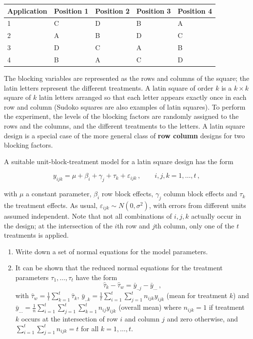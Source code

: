 \documentclass[
]{book}
\theoremstyle{definition}
\theoremstyle{definition}
\theoremstyle{definition}
\theoremstyle{definition}
\theoremstyle{remark}
\begin{document}
\begin{enumerate}
  \begin{tabular}{l|l|l|l|l}
   \hline
   Application & Position 1 & Position 2 & Position 3 & Position 4\\
   \hline
   1 & C & D & B & A\\
   \hline
   2 & A & B & D & C\\
   \hline
   3 & D & C & A & B\\
   \hline
   4 & B & A & C & D\\
   \hline
   \end{tabular}

  The blocking variables are represented as the rows and columns of the square; the latin letters represent the different treatments. A latin square of order \(k\) is a \(k\times k\) square of \(k\) latin letters arranged so that each letter appears exactly once in each row and column (Sudoko squares are also examples of latin squares). To perform the experiment, the levels of the blocking factors are randomly assigned to the rows and the columns, and the different treatments to the letters. A latin square design is a special case of the more general class of \textbf{row column} designs for two blocking factors.

  A suitable unit-block-treatment model for a latin square design has the form

  \[
   y_{ijk} = \mu + \beta_i + \gamma_j + \tau_k + \varepsilon_{ijk}\,,\qquad i,j,k = 1,\ldots, t\,,
   \]

  with \(\mu\) a constant parameter, \(\beta_i\) row block effects, \(\gamma_j\) column block effects and \(\tau_k\) the treatment effects. As usual, \(\varepsilon_{ijk}\sim N(0, \sigma^2)\), with errors from different units assumed independent. Note that not all combinations of \(i,j,k\) actually occur in the design; at the intersection of the \(i\)th row and \(j\)th column, only one of the \(t\) treatments is applied.

  \begin{enumerate}
  \def\labelenumii{\alph{enumii}.}
  \item
    Write down a set of normal equations for the model parameters.
  \item
    It can be shown that the reduced normal equations for the treatment parameters \(\tau_1,\ldots, \tau_t\) have the form
    \[
     \hat{\tau}_k - \hat{\tau}_w = \bar{y}_{..j} - \bar{y}_{...}\,,
     \]
    with \(\hat{\tau}_w = \frac{1}{t}\sum_{k=1}^t\hat{\tau}_k\), \(\bar{y}_{..k} = \frac{1}{t}\sum_{i=1}^t\sum_{j=1}^tn_{ijk}y_{ijk}\) (mean for treatment \(k\)) and \(\bar{y}_{...} = \frac{1}{n}\sum_{i=1}^t\sum_{j=1}^t\sum_{k=1}^tn_{ij}y_{ijk}\) (overall mean) where \(n_{ijk} = 1\) if treatment \(k\) occurs at the intersection of row \(i\) and column \(j\) and zero otherwise, and \(\sum_{i=1}^t\sum_{j=1}^tn_{ijk} = t\) for all \(k=1, \ldots, t\).


\end{enumerate}
\end{enumerate}
\end{document}
